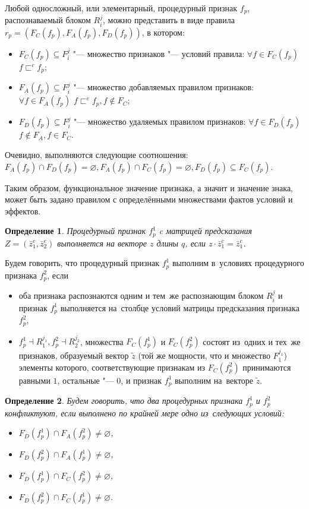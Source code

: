 \documentclass[a4paper, 12pt]{article}
\theoremstyle{plain}
\newtheorem{Def}{Определение}
\begin{document}
		Любой односложный, или элементарный, процедурный признак $f_p$, распознаваемый блоком $R_i^j$, можно представить в виде правила $r_p=(F_C(f_p),F_A(f_p),F_D(f_p))$, в котором:
		\begin{itemize}
			\item $F_C (f_p )\subseteq F_i^j$ "--- множество признаков "--- условий правила: $\forall f\in F_C(f_p)$ $f\sqsubset^c f_p$;
			\item $F_A(f_p)\subseteq F_i^j$ "--- множество добавляемых правилом признаков: $\forall f\in F_A(f_p)$ $f\sqsubset^e f_p,f\notin F_C$;
			\item $F_D(f_p)\subseteq F_i^j$ "--- множество удаляемых правилом признаков: $\forall f\in F_D(f_p)$ $f\notin F_A,f\in F_C$.
		\end{itemize}
		Очевидно, выполняются следующие соотношения: $F_A(f_p)\cap F_D(f_p)=\varnothing, F_A(f_p)\cap F_C(f_p)=\varnothing, F_D(f_p)\subseteq F_C(f_p)$.
		
		Таким образом, функциональное значение признака, а значит и значение знака, может быть задано правилом с определёнными множествами фактов условий и эффектов.
		\begin{Def}
			Процедурный признак $f_p^1$ c матрицей предсказания $Z=(\bar z_1^c,\bar z_2^e)$ выполняется на векторе $z$ длины $q$, если $z\cdot \bar z_1^c=\bar z_1^c$.
		\end{Def}
		Будем говорить, что процедурный признак $f_p^1$ выполним в~условиях процедурного признака $f_p^2$, если 
		\begin{itemize}
			\item оба признака распознаются одним и тем~же распознающим блоком $R_i^j$ и признак  $f_p^1$ выполняется на~столбце условий матрицы предсказания признака $f_p^2$,
			\item $f_p^1\dashv R_1^{j_1}, f_p^2\dashv R_2^{j_2}$, множества $F_C(f_p^1 )$ и $F_C(f_p^2)$ состоят из~одних и тех~же признаков, образуемый вектор $\tilde z$ (той же мощности, что и множество $F_1^{j_1}$) элементы которого, соответствующие признакам из $F_C(f_p^2)$ принимаются равными $1$,  остальные "--- $0$, и признак $f_p^1$ выполним на~векторе $\tilde z$. 
		\end{itemize}
		
		\begin{Def}
			Будем говорить, что два процедурных признака $f_p^1$ и $f_p^2$ конфликтуют, если выполнено по крайней мере одно из~следующих условий:
			\begin{itemize}
				\item $F_D(f_p^1)\cap F_A(f_p^2)\not=\varnothing$,
				\item $F_D(f_p^2)\cap F_A(f_p^1)\not=\varnothing$,
				\item $F_D(f_p^1)\cap F_C(f_p^2)\not=\varnothing$,
				\item $F_D(f_p^2)\cap F_C(f_p^1)\not=\varnothing$.
			\end{itemize}
		\end{Def}
		
\end{document}
